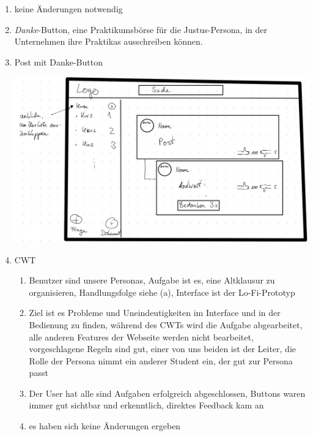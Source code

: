 \documentclass{article}
\begin{document}
\begin{enumerate}[label=(\alph*)]
\begin{enumerate}[label=\arabic*.]
\begin{enumerate}
			\end{enumerate}
		\end{enumerate}
		\item keine Änderungen notwendig
		\item \textit{Danke}-Button, eine Praktikumsbörse für die Justus-Persona, in der Unternehmen ihre Praktikas ausschreiben können.
		\item Post mit Danke-Button
		\begin{center}
			\includegraphics[scale=0.1]{Post-mit-Danke-Button}
		\end{center}
		\item CWT
		\begin{enumerate}[label=\arabic*.]
			\item Benutzer sind unsere Personas, Aufgabe ist es, eine Altklausur zu organisieren, Handlungsfolge siehe (a), Interface ist der Lo-Fi-Prototyp
			\item Ziel ist es Probleme und Uneindeutigkeiten im Interface und in der Bedienung zu finden, während des CWTs wird die Aufgabe abgearbeitet, alle anderen Features der Webseite werden nicht bearbeitet, vorgeschlagene Regeln sind gut, einer von uns beiden ist der Leiter, die Rolle der Persona nimmt ein anderer Student ein, der gut zur Persona passt
			\item Der User hat alle sind Aufgaben erfolgreich abgeschlossen, Buttons waren immer gut sichtbar und erkenntlich, direktes Feedback kam an
			\item es haben sich keine Änderungen ergeben
		\end{enumerate}
	\end{enumerate}
	
\end{document}

